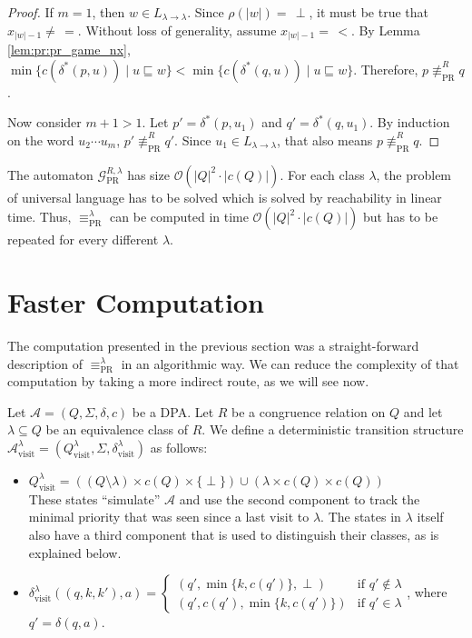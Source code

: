 \begin{proof}
	If $m = 1$, then $w \in L_{\lambda \rightarrow \lambda}$. Since $\rho(|w|) =\, \perp$, it must be true that $x_{|w|-1} \neq\, =$. Without loss of generality, assume $x_{|w|-1} =\, <$. By Lemma \ref{lem:pr:pr_game_nx}, $\min \{ c(\delta^*(p, u)) \mid u \sqsubseteq w \} < \min \{ c(\delta^*(q, u)) \mid u \sqsubseteq w \}$. Therefore, $p \not\equiv_\text{PR}^R q$.
	
	Now consider $m+1 > 1$. Let $p' = \delta^*(p, u_1)$ and $q' = \delta^*(q, u_1)$. By induction on the word $u_2 \cdots u_m$, $p' \not\equiv_\text{PR}^R q'$. Since $u_1 \in L_{\lambda \rightarrow \lambda}$, that also means $p \not\equiv_\text{PR}^R q$.
\end{proof}

\vspace{5pt}
The automaton $\mathcal{G}_\text{PR}^{R,\lambda}$ has size $\mathcal{O}(|Q|^2 \cdot |c(Q)|)$. For each class $\lambda$, the problem of universal language has to be solved which is solved by reachability in linear time. Thus, $\equiv_\text{PR}^\lambda$ can be computed in time $\mathcal{O}(|Q|^2 \cdot |c(Q)|)$ but has to be repeated for every different $\lambda$.



\section{Faster Computation}
The computation presented in the previous section was a straight-forward description of $\equiv_\text{PR}^\lambda$ in an algorithmic way. We can reduce the complexity of that computation by taking a more indirect route, as we will see now.

\begin{defn}
	Let $\mathcal{A} = (Q, \Sigma, \delta, c)$ be a DPA. Let $R$ be a congruence relation on $Q$ and let $\lambda \subseteq Q$ be an equivalence class of $R$. We define a deterministic transition structure $\mathcal{A}^\lambda_\text{visit} = (Q^\lambda_\text{visit}, \Sigma, \delta^\lambda_\text{visit})$ as follows:
	
	\begin{itemize}
		\item $Q^\lambda_\text{visit} = ((Q \setminus \lambda) \times c(Q) \times \{\perp\}) \cup (\lambda \times c(Q) \times c(Q))$ \\
		These states \enquote{simulate} $\mathcal{A}$ and use the second component to track the minimal priority that was seen since a last visit to $\lambda$. The states in $\lambda$ itself also have a third component that is used to distinguish their classes, as is explained below.
		\item $\delta^\lambda_\text{visit}((q, k, k'), a) = \begin{cases}
			(q', \min \{k, c(q')\}, \perp) & \text{if } q' \notin \lambda \\
			(q', c(q'), \min \{k, c(q')\}) & \text{if } q' \in \lambda
		\end{cases}$, where $q' = \delta(q, a)$.
	\end{itemize}
\end{defn}

